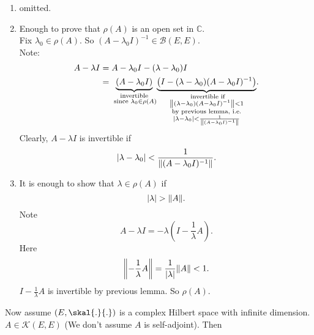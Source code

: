 \begin{beweis}
	\begin{enumerate}
		\item omitted.
		\item Enough to prove that $\rho(A)$ is an open set in $\mathbb{C}$. \\
		Fix $\lambda_0 \in \rho(A)$. So $(A- \lambda_0 I)^{-1} \in \mathcal{B}(E,E)$. \\ Note:
		\begin{align*}
			A-\lambda I &= A - \lambda_0 I - (\lambda - \lambda_0)I \\
			&= \underset{\substack{\text{invertible} \\ \text{ since }\lambda_0 \in \rho(A)}}{\underbrace{(A-\lambda_0 I)}} \underset{\substack{ \text{ invertible if} \\ \norm{(\lambda-\lambda_0)(A- \lambda_0 I)^{-1}}<1 \\ \text{by previous lemma, i.e.} \\ \abs{\lambda - \lambda_0} < \frac{1}{\norm{(A- \lambda_0 I)^{-1}}}}}{\underbrace{\left( I - (\lambda - \lambda_0)(A- \lambda_0 I)^{-1} \right)}}.
		\end{align*}
		Clearly, $A-\lambda I$ is invertible if
		\[
			\abs{\lambda - \lambda_0} < \frac{1}{\norm{(A- \lambda_0 I)^{-1}}}.
		\]
		\item It is enough to show that $\lambda \in \rho(A)$ if \[
			\abs{\lambda} > \norm{A}.
		\]
		Note 
		\[
			A- \lambda I = - \lambda (I - \frac{1}{\lambda}A).
		\]
		Here 
		\[
			\norm{- \frac{1}{\lambda}A} = \frac{1}{\abs{\lambda}} \norm{A} < 1.
		\]
		$I - \frac{1}{\lambda}A$ is invertible by previous lemma. So $\rho(A)$.
	\end{enumerate}
\end{beweis}
Now assume $(E,\skal{.}{.})$ is a complex Hilbert space with infinite dimension. $A \in \mathcal{K}(E,E)$ (We don't assume $A$ is self-adjoint). Then
